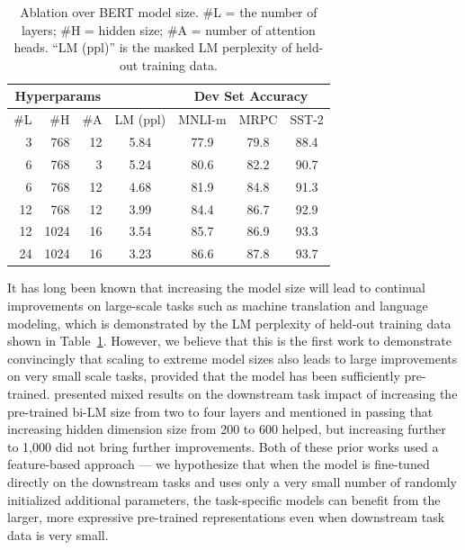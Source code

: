 \documentclass[11pt,a4paper]{article}
\begin{document}
\begin{table}[b]
\begin{center}
{\small
\begin{tabular}{@{}rrrcccc@{}}
  \toprule
  \multicolumn{3}{c}{Hyperparams}      &      & \multicolumn{3}{c}{Dev Set Accuracy} \\
  \midrule
  \#L & \#H &\#A & LM (ppl) & MNLI-m & MRPC &SST-2               \\
  \midrule
  \
   3 &  768 & 12 & 5.84 & 77.9 & 79.8 & 88.4 \\
   6 &  768 &  3 & 5.24 & 80.6 & 82.2 & 90.7 \\
   6 &  768 & 12 & 4.68 & 81.9 & 84.8 & 91.3 \\
  12 &  768 & 12 & 3.99 & 84.4 & 86.7 & 92.9 \\
  12 & 1024 & 16 & 3.54 & 85.7 & 86.9 & 93.3 \\
  24 & 1024 & 16 & 3.23 & 86.6 & 87.8 & 93.7 \\
\bottomrule
\end{tabular}
} 
\end{center}
\caption{\label{tab:size_ablation} Ablation over BERT model size. \#L = the number of layers; \#H = hidden size; \#A = number of attention heads. ``LM (ppl)'' is the masked LM perplexity of held-out training data.}
\end{table}

It has long been known that increasing the model size will lead to continual improvements on large-scale tasks such as machine translation and language modeling, which is demonstrated by the LM perplexity of held-out training data shown in Table~\ref{tab:size_ablation}. However, we believe that this is the first work to demonstrate convincingly that scaling to extreme model sizes also leads to large improvements on very small scale tasks, provided that the model has been sufficiently pre-trained. \citet{peters2018dissecting} presented mixed results on the downstream task impact of increasing the pre-trained bi-LM size from two to four layers and \citet{melamud2016context2vec} mentioned in passing that increasing hidden dimension size from 200 to 600 helped, but increasing further to 1,000 did not bring further improvements. Both of these prior works used a feature-based approach --- we hypothesize that when the model is fine-tuned directly on the downstream tasks and uses only a very small number of randomly initialized additional parameters, the task-specific models can benefit from the larger, more expressive pre-trained representations even when downstream task data is very small. 
\end{document}

